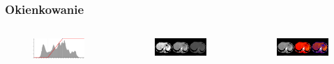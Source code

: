 \documentclass[aspectratio=169]{beamer}
\begin{document}
\begin{frame}[t]

    \frametitle{Okienkowanie}

    \vspace{-1em}

    \begin{columns}[t]
        \vspace{-1.0em}
        \begin{figure}
            \includegraphics[width=1\textwidth]{img/windowing-chart.png}
        \end{figure}
        \vspace{-1.0em}
        \begin{figure}
            \includegraphics[trim={0 1cm 0 2cm},clip,width=1\textwidth]{img/monochrome-002.png}
        \end{figure}
        \vspace{-2.0em}
        \begin{figure}
            \includegraphics[trim={0 1cm 0 2cm},clip,width=1\textwidth]{img/monochrome-003.png}
        \end{figure}


\end{columns}
\end{frame}
\end{document}
